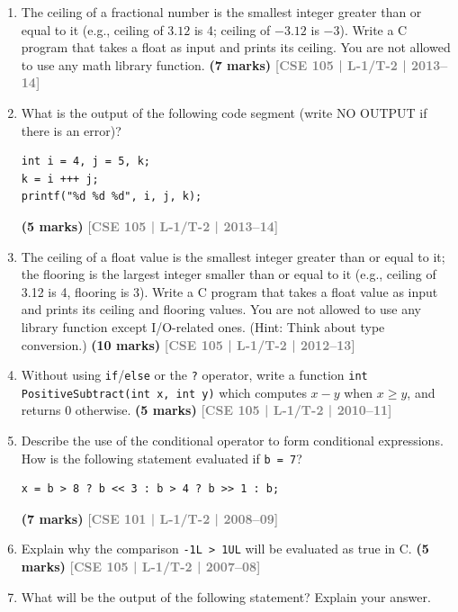 \documentclass[12pt,a3paper]{article}
\newcommand{\yr}[1]{\hfill\textcolor{gray}{\small\textbf{[#1]}}}
\newcommand{\mk}[1]{\textcolor{orange!70!black}{\small\textbf{(#1 marks)}}}
\begin{document}
\begin{enumerate}
\item The ceiling of a fractional number is the smallest integer greater than or equal to it (e.g., ceiling of $3.12$ is 4; ceiling of $-3.12$ is $-3$). Write a C program that takes a float as input and prints its ceiling. You are not allowed to use any math library function.
\mk{7} \yr{CSE 105 | L-1/T-2 | 2013--14}

\item What is the output of the following code segment (write NO OUTPUT if there is an error)?
 
\begin{lstlisting}
int i = 4, j = 5, k;
k = i +++ j;
printf("%d %d %d", i, j, k);
\end{lstlisting}
\mk{5} \yr{CSE 105 | L-1/T-2 | 2013--14}

\item The ceiling of a float value is the smallest integer greater than or equal to it; the flooring is the largest integer smaller than or equal to it (e.g., ceiling of 3.12 is 4, flooring is 3). Write a C program that takes a float value as input and prints its ceiling and flooring values. You are not allowed to use any library function except I/O-related ones. (Hint: Think about type conversion.)
\mk{10} \yr{CSE 105 | L-1/T-2 | 2012--13}

\item Without using \texttt{if}/\texttt{else} or the \texttt{?} operator, write a function \texttt{int PositiveSubtract(int x, int y)} which computes $x - y$ when $x \ge y$, and returns 0 otherwise.
\mk{5} \yr{CSE 105 | L-1/T-2 | 2010--11}

\item Describe the use of the conditional operator to form conditional expressions. How is the following statement evaluated if \texttt{b = 7}?
 
\begin{lstlisting}
x = b > 8 ? b << 3 : b > 4 ? b >> 1 : b;
\end{lstlisting}
\mk{7} \yr{CSE 101 | L-1/T-2 | 2008--09}

\item Explain why the comparison \texttt{-1L > 1UL} will be evaluated as true in C.
\mk{5} \yr{CSE 105 | L-1/T-2 | 2007--08}

\item What will be the output of the following statement? Explain your answer.
 

\end{enumerate}
\end{document}
